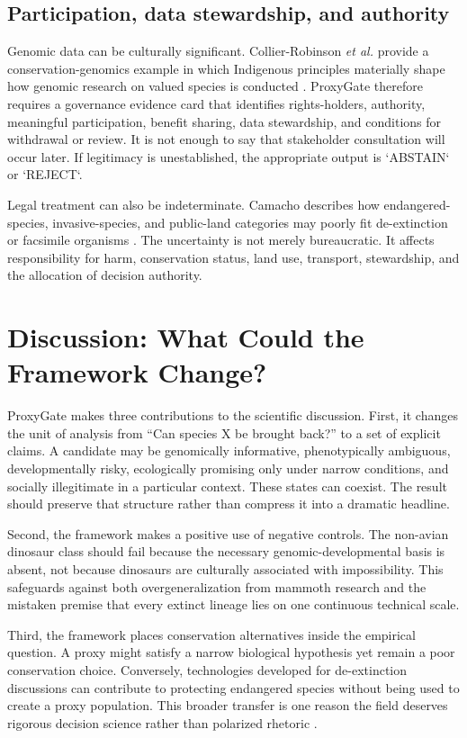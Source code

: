 \documentclass[conference]{IEEEtran}
\begin{document}
\subsection{Participation, data stewardship, and authority}

Genomic data can be culturally significant. Collier-Robinson \emph{et al.} provide a conservation-genomics example in which Indigenous principles materially shape how genomic research on valued species is conducted \cite{collierrobinson2019}. ProxyGate therefore requires a governance evidence card that identifies rights-holders, authority, meaningful participation, benefit sharing, data stewardship, and conditions for withdrawal or review. It is not enough to say that stakeholder consultation will occur later. If legitimacy is unestablished, the appropriate output is `ABSTAIN` or `REJECT`.

Legal treatment can also be indeterminate. Camacho describes how endangered-species, invasive-species, and public-land categories may poorly fit de-extinction or facsimile organisms \cite{camacho2014}. The uncertainty is not merely bureaucratic. It affects responsibility for harm, conservation status, land use, transport, stewardship, and the allocation of decision authority.

\section{Discussion: What Could the Framework Change?}

ProxyGate makes three contributions to the scientific discussion. First, it changes the unit of analysis from ``Can species X be brought back?'' to a set of explicit claims. A candidate may be genomically informative, phenotypically ambiguous, developmentally risky, ecologically promising only under narrow conditions, and socially illegitimate in a particular context. These states can coexist. The result should preserve that structure rather than compress it into a dramatic headline.

Second, the framework makes a positive use of negative controls. The non-avian dinosaur class should fail because the necessary genomic-developmental basis is absent, not because dinosaurs are culturally associated with impossibility. This safeguards against both overgeneralization from mammoth research and the mistaken premise that every extinct lineage lies on one continuous technical scale.

Third, the framework places conservation alternatives inside the empirical question. A proxy might satisfy a narrow biological hypothesis yet remain a poor conservation choice. Conversely, technologies developed for de-extinction discussions can contribute to protecting endangered species without being used to create a proxy population. This broader transfer is one reason the field deserves rigorous decision science rather than polarized rhetoric \cite{turner2025}.
\end{document}
